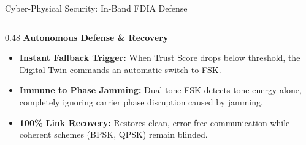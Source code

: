 \documentclass[aspectratio=169, 10pt]{beamer}
\begin{document}
\begin{frame}{Cyber-Physical Security: In-Band FDIA Defense}
\begin{columns}[T]
    \begin{column}{0.48\linewidth}
      \textbf{\color{primaryblue}\normalsize Autonomous Defense \& Recovery}\\[0.10cm]
      \begin{itemize}\setlength{\itemsep}{6pt}\small
        \item \textbf{Instant Fallback Trigger:} When Trust Score drops below threshold, the Digital Twin commands an automatic switch to FSK.
        \item \textbf{Immune to Phase Jamming:} Dual-tone FSK detects tone energy alone, completely ignoring carrier phase disruption caused by jamming.
        \item \textbf{100\% Link Recovery:} Restores clean, error-free communication while coherent schemes (BPSK, QPSK) remain blinded.
      \end{itemize}
    \end{column}
  \end{columns}
\end{frame}
\end{document}
